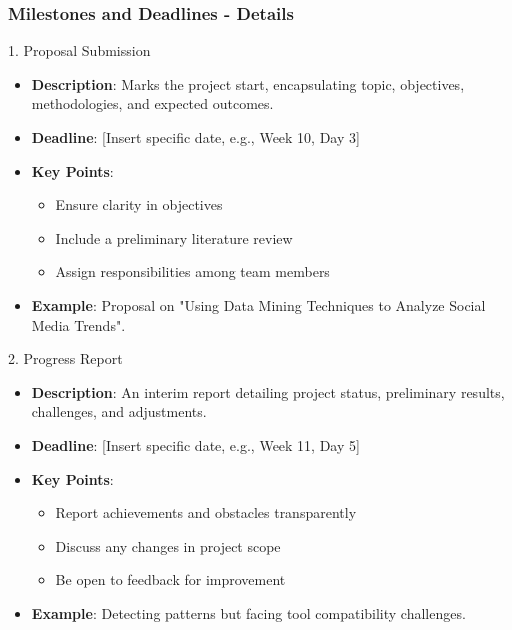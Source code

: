 \documentclass[aspectratio=169]{beamer}
\begin{document}
\begin{frame}[fragile]
    \frametitle{Milestones and Deadlines - Details}
    \begin{block}{1. Proposal Submission}
        \begin{itemize}
            \item \textbf{Description}: Marks the project start, encapsulating topic, objectives, methodologies, and expected outcomes.
            \item \textbf{Deadline}: [Insert specific date, e.g., Week 10, Day 3]
            \item \textbf{Key Points}:
            \begin{itemize}
                \item Ensure clarity in objectives
                \item Include a preliminary literature review
                \item Assign responsibilities among team members
            \end{itemize}
            \item \textbf{Example}: Proposal on "Using Data Mining Techniques to Analyze Social Media Trends".
        \end{itemize}
    \end{block}
    \pause
    \begin{block}{2. Progress Report}
        \begin{itemize}
            \item \textbf{Description}: An interim report detailing project status, preliminary results, challenges, and adjustments.
            \item \textbf{Deadline}: [Insert specific date, e.g., Week 11, Day 5]
            \item \textbf{Key Points}:
            \begin{itemize}
                \item Report achievements and obstacles transparently
                \item Discuss any changes in project scope
                \item Be open to feedback for improvement
            \end{itemize}
            \item \textbf{Example}: Detecting patterns but facing tool compatibility challenges.
        \end{itemize}
    \end{block}
\end{frame}
\end{document}
